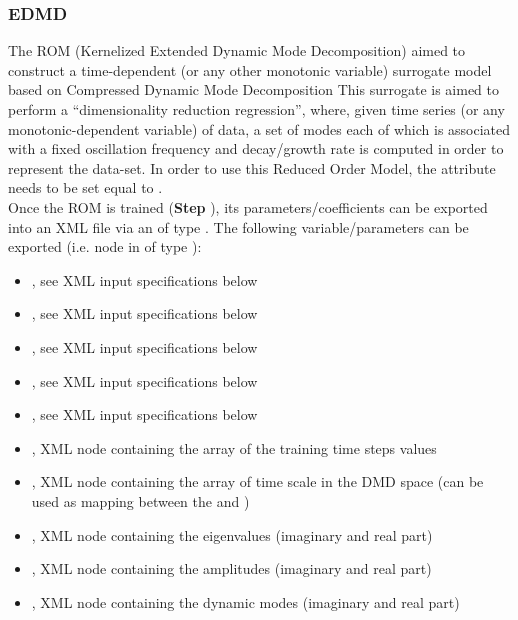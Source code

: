 \subsubsection{EDMD}
  The  ROM (Kernelized Extended Dynamic Mode Decomposition) aimed to construct a
  time-dependent (or any other monotonic     variable) surrogate model based on Compressed Dynamic
  Mode Decomposition     This surrogate is aimed to perform a ``dimensionality reduction
  regression'', where, given time     series (or any monotonic-dependent variable) of data, a set of
  modes each of which is associated     with a fixed oscillation frequency and decay/growth rate is
  computed     in order to represent the data-set.     In order to use this Reduced Order Model, the
   attribute      needs to be set equal to .     \\
  Once the ROM  is trained (\textbf{Step} ), its parameters/coefficients can be
  exported into an XML file     via an  of type . The following
  variable/parameters  can be exported (i.e.  node     in  of type
  ):     \begin{itemize}       \item {}, see XML input
  specifications below       \item {}, see XML input specifications below
  \item {}, see XML input specifications below       \item {}, see
  XML input specifications below       \item {}, see XML input specifications below
  \item {}, XML node containing the array of the training time steps values
  \item {}, XML node containing the array of time scale in the DMD space (can be
  used as mapping       between the   and )       \item
  , XML node containing the eigenvalues (imaginary and real part)       \item
  , XML node containing the amplitudes (imaginary and real part)       \item
  , XML node containing the dynamic modes (imaginary and real part)     \end{itemize}

